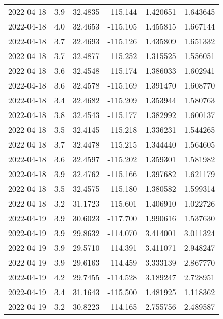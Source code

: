 \begin{tabular}{lrrrrr}
2022-04-18 &       3.9 &  32.4835 &  -115.144 &         1.420651 &         1.643645 \\
2022-04-18 &       4.0 &  32.4653 &  -115.105 &         1.455815 &         1.667144 \\
2022-04-18 &       3.7 &  32.4693 &  -115.126 &         1.435809 &         1.651332 \\
2022-04-18 &       3.7 &  32.4877 &  -115.252 &         1.315525 &         1.556051 \\
2022-04-18 &       3.6 &  32.4548 &  -115.174 &         1.386033 &         1.602941 \\
2022-04-18 &       3.6 &  32.4578 &  -115.169 &         1.391470 &         1.608770 \\
2022-04-18 &       3.4 &  32.4682 &  -115.209 &         1.353944 &         1.580763 \\
2022-04-18 &       3.8 &  32.4543 &  -115.177 &         1.382992 &         1.600137 \\
2022-04-18 &       3.5 &  32.4145 &  -115.218 &         1.336231 &         1.544265 \\
2022-04-18 &       3.7 &  32.4478 &  -115.215 &         1.344440 &         1.564605 \\
2022-04-18 &       3.6 &  32.4597 &  -115.202 &         1.359301 &         1.581982 \\
2022-04-18 &       3.9 &  32.4762 &  -115.166 &         1.397682 &         1.621179 \\
2022-04-18 &       3.5 &  32.4575 &  -115.180 &         1.380582 &         1.599314 \\
2022-04-18 &       3.2 &  31.1723 &  -115.601 &         1.406910 &         1.022726 \\
2022-04-19 &       3.9 &  30.6023 &  -117.700 &         1.990616 &         1.537630 \\
2022-04-19 &       3.9 &  29.8632 &  -114.070 &         3.414001 &         3.011324 \\
2022-04-19 &       3.9 &  29.5710 &  -114.391 &         3.411071 &         2.948247 \\
2022-04-19 &       3.9 &  29.6163 &  -114.459 &         3.333139 &         2.867770 \\
2022-04-19 &       4.2 &  29.7455 &  -114.528 &         3.189247 &         2.728951 \\
2022-04-19 &       3.4 &  31.1643 &  -115.500 &         1.481925 &         1.118362 \\
2022-04-19 &       3.2 &  30.8223 &  -114.165 &         2.755756 &         2.489587 \\

\end{tabular}
